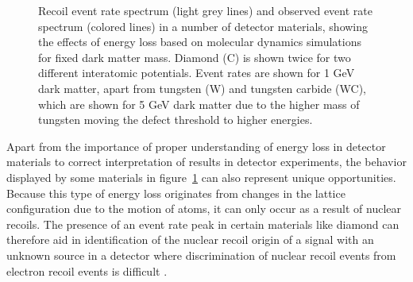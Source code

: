 \documentclass[b5paper, 10pt, twoside]{book}
\newcommand{\gecolor}{scp-blue-dark-1}
\newcommand{\sicolor}{scp-grey-dark-1}
\newcommand{\wccolor}{scp-orange-dark-1}
\newcommand{\wcolor}{scp-brown-dark-1}
\begin{document}
\begin{figure}
\caption{Recoil event rate spectrum (light grey lines) and observed event rate spectrum (colored lines) in a number of detector materials, showing the effects of energy loss based on molecular dynamics simulations for fixed dark matter mass. Diamond (C) is shown twice for two different interatomic potentials. Event rates are shown for 1 GeV dark matter, apart from tungsten (W) and tungsten carbide (WC), which are shown for 5 GeV dark matter due to the higher mass of tungsten moving the defect threshold to higher energies.}
\label{fig:event-rate-eloss}
\end{figure}

Apart from the importance of proper understanding of energy loss in detector materials to correct interpretation of results in detector experiments, the behavior displayed by some materials in figure~\ref{fig:event-rate-eloss} can also represent unique opportunities. Because this type of energy loss originates from changes in the lattice configuration due to the motion of atoms, it can only occur as a result of nuclear recoils. The presence of an event rate peak in certain materials like diamond can therefore aid in identification of the nuclear recoil origin of a signal with an unknown source in a detector where discrimination of nuclear recoil events from electron recoil events is difficult \parencite{HeikinheimoEtAl2022}.
\end{document}
